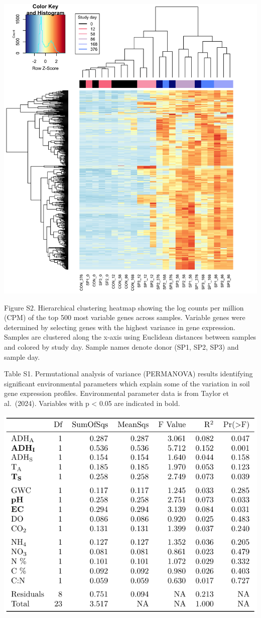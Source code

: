\documentclass[
  letterpaper,
  DIV=11,
  numbers=noendperiod]{scrartcl}
\begin{document}
\includegraphics[width=1\textwidth]{../../figures/Fig_S2.png}

Figure S2. Hierarchical clustering heatmap showing the log counts per
million (CPM) of the top 500 most variable genes across samples.
Variable genes were determined by selecting genes with the highest
variance in gene expression. Samples are clustered along the x-axis
using Euclidean distances between samples and colored by study day.
Sample names denote donor (SP1, SP2, SP3) and sample day.

\pagebreak

Table S1. Permutational analysis of variance (PERMANOVA) results
identifying significant environmental parameters which explain some of
the variation in soil gene expression profiles. Environmental parameter
data is from Taylor et al.~(2024). Variables with p \textless{} 0.05 are
indicated in bold.

\includegraphics[scale=1.4,page=1]{../../tables/cca_permanova.pdf}
\end{document}
